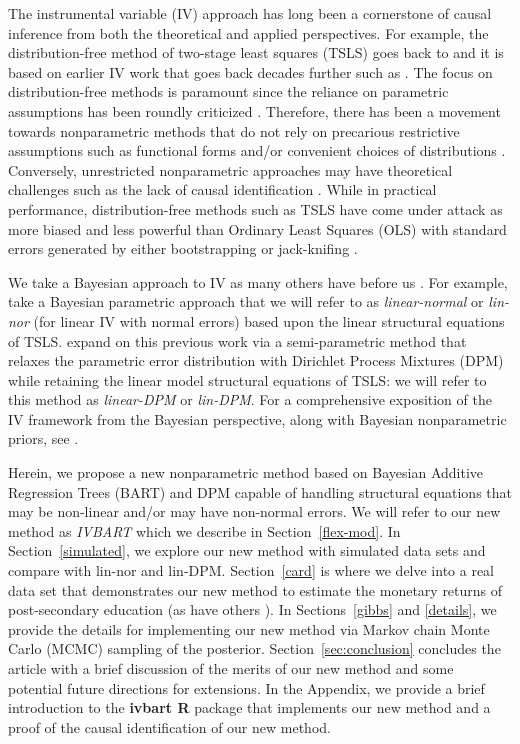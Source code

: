 
The instrumental variable (IV) approach has long been a cornerstone of
causal inference from both the theoretical and applied perspectives.
For example, the distribution-free method of two-stage least squares
(TSLS) goes back to \cite{Thei53} and it is based on earlier IV work
that goes back decades further such as \cite{Wrig28}.  The focus on
distribution-free methods is paramount since the reliance on
parametric assumptions has been roundly criticized \citep{LaLo86}.
Therefore, there has been a movement towards nonparametric methods
that do not rely on precarious restrictive assumptions such as
functional forms and/or convenient choices of distributions
\citep{AngrImbe95}.  Conversely, unrestricted nonparametric approaches
may have theoretical challenges such as the lack of causal
identification \citep{Pear09}.  While in practical performance,
distribution-free methods such as TSLS have come under attack as more
biased and less powerful than Ordinary Least Squares (OLS) with
standard errors generated by either bootstrapping or jack-knifing
\citep{Youn19}.

We take a Bayesian approach to IV as many others have before us
\citep{ImbeRubi97,RossAlle05,CHMR08,ROSSI14}.  For example,
\cite{RossAlle05} take a Bayesian parametric approach that we will
refer to as {\it linear-normal} or {\it lin-nor} (for linear IV with
normal errors) based upon the linear structural equations of TSLS.
\cite{CHMR08} expand on this previous work via a semi-parametric
method that relaxes the parametric error distribution with Dirichlet
Process Mixtures (DPM) \citep{EW95} while retaining the linear model
structural equations of TSLS: we will refer to this method as {\it
linear-DPM} or {\it lin-DPM}.  For a comprehensive exposition of the
IV framework from the Bayesian perspective, along with Bayesian
nonparametric priors, see \cite{ROSSI14}.

Herein, we propose a new nonparametric method based on Bayesian
Additive Regression Trees (BART) \citep{ChipGeor10} and DPM
capable of handling structural equations that may be non-linear and/or
may have non-normal errors.  We will refer to our new method as {\it
IVBART} which we describe in Section~\ref{flex-mod}.  In
Section~\ref{simulated}, we explore our new method with simulated data
sets and compare with lin-nor and lin-DPM.  Section~\ref{card} is
where we delve into a real data set that
demonstrates our new method to estimate the monetary returns of
post-secondary education (as have others \citep{Card93,CHMR08}).  In
Sections~\ref{gibbs} and \ref{details},
we provide the details for implementing our new method via Markov
chain Monte Carlo (MCMC) sampling of the posterior.
Section~\ref{sec:conclusion} concludes the article with a brief
discussion of the merits of our new method and some potential future
directions for extensions.  In the Appendix, we provide a brief
introduction to the {\bf ivbart R} package that implements our new
method and a proof of the causal identification of our new method.

